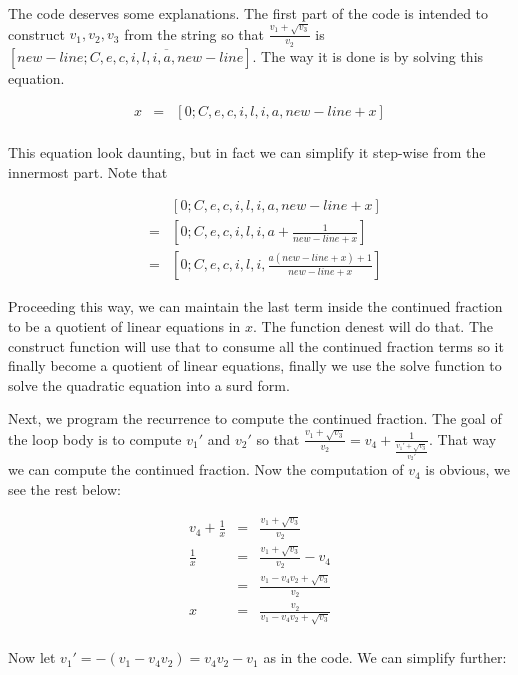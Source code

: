 \documentclass{article}
\begin{document}
The code deserves some explanations. The first part of the code is intended to construct $ v_1, v_2, v_3 $ from the string so that $ \frac{v_1 + \sqrt{v_3}}{v_2} $ is $ [new-line;\overline{C,e,c,i,l,i,a,new-line}] $. The way it is done is by solving this equation.

\begin{eqnarray*}
  x &=& [0;C,e,c,i,l,i,a,new-line+x] \\
\end{eqnarray*}

This equation look daunting, but in fact we can simplify it step-wise from the innermost part. Note that

\begin{eqnarray*}
  & & [0;C,e,c,i,l,i,a,new-line+x]                           \\
  &=& [0;C,e,c,i,l,i,a + \frac{1}{new-line+x}]               \\
  &=& [0;C,e,c,i,l,i,\frac{a(new-line + x) + 1}{new-line+x}]
\end{eqnarray*}

Proceeding this way, we can maintain the last term inside the continued fraction to be a quotient of linear equations in $ x $. The function denest will do that. The construct function will use that to consume all the continued fraction terms so it finally become a quotient of linear equations, finally we use the solve function to solve the quadratic equation into a surd form.

Next, we program the recurrence to compute the continued fraction. The goal of the loop body is to compute $ v_1' $ and $ v_2' $ so that $ \frac{v_1 + \sqrt{v_3}}{v_2} = v_4 + \frac{1}{\frac{v_1' + \sqrt{v_3}}{v_2'}} $. That way we can compute the continued fraction. Now the computation of $ v_4 $ is obvious, we see the rest below:

\begin{eqnarray*}
  v_4 + \frac{1}{x} &=& \frac{v_1 + \sqrt{v_3}}{v_2}           \\
        \frac{1}{x} &=& \frac{v_1 + \sqrt{v_3}}{v_2} - v_4     \\
                    &=& \frac{v_1 - v_4 v_2 + \sqrt{v_3}}{v_2} \\
                  x &=& \frac{v_2}{v_1 - v_4 v_2 + \sqrt{v_3}} \\
\end{eqnarray*}

Now let $ v_1' = - (v_1 - v_4 v_2) = v_4 v_2 - v_1 $ as in the code. We can simplify further:
\end{document}
